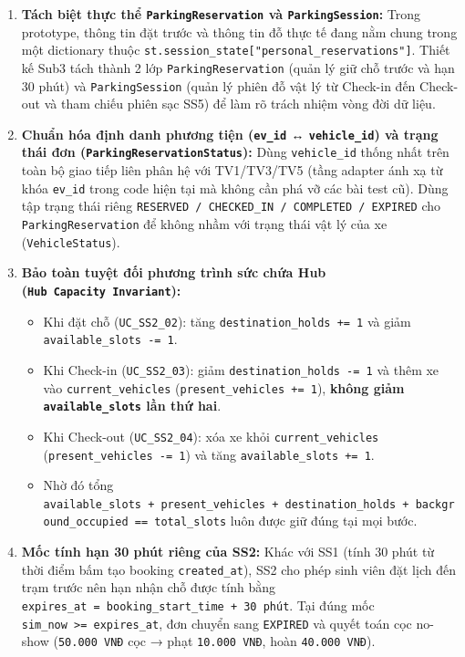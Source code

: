 \documentclass[11pt,a4paper]{article}
\providecommand{\tightlist}{%
  \setlength{\itemsep}{0pt}\setlength{\parskip}{0pt}}
\begin{document}
\begin{enumerate}
\def\labelenumi{\arabic{enumi}.}
\tightlist
\item
  \textbf{Tách biệt thực thể \texttt{ParkingReservation} và
  \texttt{ParkingSession}:} Trong prototype, thông tin đặt trước và
  thông tin đỗ thực tế đang nằm chung trong một dictionary thuộc
  \texttt{st.session\_state{[}"personal\_reservations"{]}}. Thiết kế
  Sub3 tách thành 2 lớp \texttt{ParkingReservation} (quản lý giữ chỗ
  trước và hạn 30 phút) và \texttt{ParkingSession} (quản lý phiên đỗ vật
  lý từ Check-in đến Check-out và tham chiếu phiên sạc SS5) để làm rõ
  trách nhiệm vòng đời dữ liệu.
\item
  \textbf{Chuẩn hóa định danh phương tiện (\texttt{ev\_id} ↔
  \texttt{vehicle\_id}) và trạng thái đơn
  (\texttt{ParkingReservationStatus}):} Dùng \texttt{vehicle\_id} thống
  nhất trên toàn bộ giao tiếp liên phân hệ với TV1/TV3/TV5 (tầng adapter
  ánh xạ từ khóa \texttt{ev\_id} trong code hiện tại mà không cần phá vỡ
  các bài test cũ). Dùng tập trạng thái riêng
  \texttt{RESERVED\ /\ CHECKED\_IN\ /\ COMPLETED\ /\ EXPIRED} cho
  \texttt{ParkingReservation} để không nhầm với trạng thái vật lý của xe
  (\texttt{VehicleStatus}).
\item
  \textbf{Bảo toàn tuyệt đối phương trình sức chứa Hub
  (\texttt{Hub\ Capacity\ Invariant}):}

  \begin{itemize}
  \tightlist
  \item
    Khi đặt chỗ (\texttt{UC\_SS2\_02}): tăng
    \texttt{destination\_holds\ +=\ 1} và giảm
    \texttt{available\_slots\ -=\ 1}.
  \item
    Khi Check-in (\texttt{UC\_SS2\_03}): giảm
    \texttt{destination\_holds\ -=\ 1} và thêm xe vào
    \texttt{current\_vehicles} (\texttt{present\_vehicles\ +=\ 1}),
    \textbf{không giảm \texttt{available\_slots} lần thứ hai}.
  \item
    Khi Check-out (\texttt{UC\_SS2\_04}): xóa xe khỏi
    \texttt{current\_vehicles} (\texttt{present\_vehicles\ -=\ 1}) và
    tăng \texttt{available\_slots\ +=\ 1}.
  \item
    Nhờ đó tổng
    \texttt{available\_slots\ +\ present\_vehicles\ +\ destination\_holds\ +\ background\_occupied\ ==\ total\_slots}
    luôn được giữ đúng tại mọi bước.
  \end{itemize}
\item
  \textbf{Mốc tính hạn 30 phút riêng của SS2:} Khác với SS1 (tính 30
  phút từ thời điểm bấm tạo booking \texttt{created\_at}), SS2 cho phép
  sinh viên đặt lịch đến trạm trước nên hạn nhận chỗ được tính bằng
  \texttt{expires\_at\ =\ booking\_start\_time\ +\ 30\ phút}. Tại đúng
  mốc \texttt{sim\_now\ \textgreater{}=\ expires\_at}, đơn chuyển sang
  \texttt{EXPIRED} và quyết toán cọc no-show (\texttt{50.000\ VNĐ} cọc →
  phạt \texttt{10.000\ VNĐ}, hoàn \texttt{40.000\ VNĐ}).
\end{enumerate}
\end{document}
